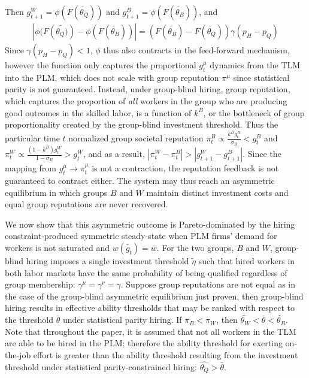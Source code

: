 \documentclass[sigconf]{acmart}
\theoremstyle{definition}
\begin{document}
Then $g^W_{t+1} = \phi(F(\widetilde{\theta_Q}))$ and $g^B_{t+1} = \phi(F(\widetilde{\theta_B}))$, and 
\begin{align*}
|\phi(F(\widetilde{\theta_Q)})-\phi(F(\widetilde{\theta_B}))| = (F(\widetilde{\theta_B}) - F(\widetilde{\theta_Q}))\gamma(p_H-p_Q)
\end{align*}
Since $\gamma(p_H-p_Q) < 1$, $\phi$ thus also contracts in the feed-forward mechanism, however the function only captures the proportional $g^\mu_t$ dynamics from the TLM into the PLM, which does not scale with group reputation $\pi^\mu$ since statistical parity is not guaranteed. Instead, under group-blind hiring, group reputation, which captures the proportion of \emph{all} workers in the group who are producing good outcomes in the skilled labor, is a function of $k^B$, or the bottleneck of group proportionality created by the group-blind investment threshold. Thus the particular time $t$ normalized group societal reputation $\pi^B_t \propto \frac{k^B g^B_t}{\sigma_B} < g^B_t$ and $\pi^W_t \propto \frac{(1-k^B)g^W_t}{1-\sigma_B} > g^W_t$, and as a result, $|\pi^W_t - \pi^B_t| > |g^W_{t+1} - g^B_{t+1}|$. Since the mapping from $g^\mu_t \to \pi^\mu_t$ is not a contraction, the reputation feedback is not guaranteed to contract either. The system may thus reach an asymmetric equilibrium in which groups $B$ and $W$ maintain distinct investment costs and equal group reputations are never recovered.
 
We now show that this asymmetric outcome is Pareto-dominated by the hiring constraint-produced symmetric steady-state when PLM firms' demand for workers is not saturated and $w(\widetilde{g_t}) = \bar{w}$. For the two groups, $B$ and $W$, group-blind hiring imposes a single investment threshold $\tilde{\eta}$ such that hired workers in both labor markets have the same probability of being qualified regardless of group membership: $\gamma^\mu = \gamma^\nu = \gamma$. Suppose group reputations are not equal as in the case of the group-blind asymmetric equilibrium just proven, then group-blind hiring results in effective ability thresholds that may be ranked with respect to the  threshold $\bar{\theta}$ under statistical parity hiring. If $\pi_B < \pi_W$, then $\widetilde{\theta_W} < \bar{\theta} <  \widetilde{\theta_B}$. Note that throughout the paper, it is assumed that not all workers in the TLM are able to be hired in the PLM; therefore the ability threshold for exerting on-the-job effort is greater than the ability threshold resulting from the investment threshold under statistical parity-constrained hiring: $\widehat{\theta_Q} > \bar{\theta}$. 
\end{document}
